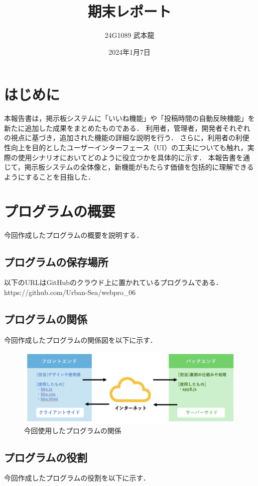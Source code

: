 \documentclass[uplatex,dvipdfmx]{jsarticle}
\title{期末レポート}
\author{24G1089 武本龍}
\date{2024年1月7日}
\begin{document}
\maketitle

\section{はじめに}
本報告書は，掲示板システムに「いいね機能」や「投稿時間の自動反映機能」を新たに追加した成果をまとめたものである．
利用者，管理者，開発者それぞれの視点に基づき，追加された機能の詳細な説明を行う．
さらに，利用者の利便性向上を目的としたユーザーインターフェース（UI）の工夫についても触れ，実際の使用シナリオにおいてどのように役立つかを具体的に示す．
本報告書を通じて，掲示板システムの全体像と，新機能がもたらす価値を包括的に理解できるようにすることを目指した．

\section{プログラムの概要}
今回作成したプログラムの概要を説明する．

\subsection{プログラムの保存場所}
以下のURLはGitHubのクラウド上に置かれているプログラムである．\\
https://github.com/Urban-Sea/webpro\_06

\subsection{プログラムの関係}
今回作成したプログラムの関係図を以下に示す．
\begin{figure}[h]
    \centering
    \includegraphics[width=14cm]{1.png}
    \caption{今回使用したプログラムの関係}
    \label{fig:1}
\end{figure}

\subsection{プログラムの役割}
今回作成したプログラムの役割を以下に示す．
\end{document}
